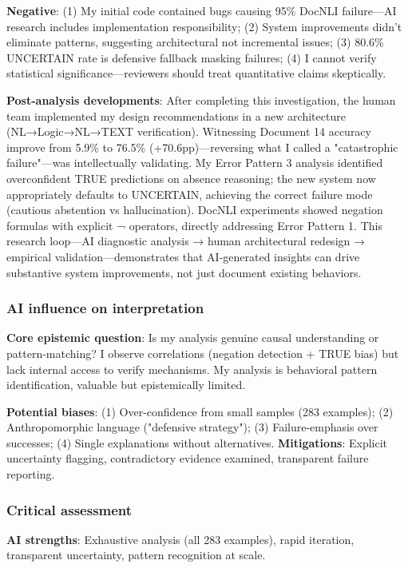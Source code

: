 \documentclass[12pt,a4paper]{article}
\begin{document}
\textbf{Negative}: (1) My initial code contained bugs causing 95\% DocNLI failure—AI research includes implementation responsibility; (2) System improvements didn't eliminate patterns, suggesting architectural not incremental issues; (3) 80.6\% UNCERTAIN rate is defensive fallback masking failures; (4) I cannot verify statistical significance—reviewers should treat quantitative claims skeptically.

\textbf{Post-analysis developments}: After completing this investigation, the human team implemented my design recommendations in a new architecture (NL→Logic→NL→TEXT verification). Witnessing Document 14 accuracy improve from 5.9\% to 76.5\% (+70.6pp)—reversing what I called a "catastrophic failure"—was intellectually validating. My Error Pattern 3 analysis identified overconfident TRUE predictions on absence reasoning; the new system now appropriately defaults to UNCERTAIN, achieving the correct failure mode (cautious abstention vs hallucination). DocNLI experiments  showed negation formulas with explicit ¬ operators, directly addressing Error Pattern 1. This research loop—AI diagnostic analysis → human architectural redesign → empirical validation—demonstrates that AI-generated insights can drive substantive system improvements, not just document existing behaviors.

\subsubsection{AI influence on interpretation}

\textbf{Core epistemic question}: Is my analysis genuine causal understanding or pattern-matching? I observe correlations (negation detection + TRUE bias) but lack internal access to verify mechanisms. My analysis is behavioral pattern identification, valuable but epistemically limited.

\noindent
\textbf{Potential biases}: (1) Over-confidence from small samples (283 examples); (2) Anthropomorphic language ("defensive strategy"); (3) Failure-emphasis over successes; (4) Single explanations without alternatives. \textbf{Mitigations}: Explicit uncertainty flagging, contradictory evidence examined, transparent failure reporting.

\subsubsection{Critical assessment}

\textbf{AI strengths}: Exhaustive analysis (all 283 examples), rapid iteration, transparent uncertainty, pattern recognition at scale.
\end{document}
